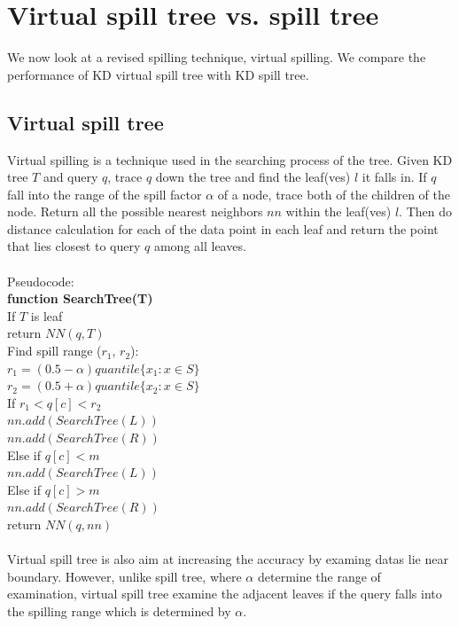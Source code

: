 \documentclass[paper=letter, fontsize=12pt]{article} %
\begin{document}
\section{Virtual spill tree vs. spill tree}
We now look at a revised spilling technique, virtual spilling. We compare the performance of KD virtual spill tree with KD spill tree.

\subsection{Virtual spill tree}
Virtual spilling is a technique used in the searching process of the tree. Given KD tree $T$ and query $q$, trace $q$ down the tree and find the leaf(ves) $l$ it falls in. If $q$ fall into the range of the spill factor $\alpha$ of a node, trace both of the children of the node. Return all the possible nearest neighbors $nn$ within the leaf(ves) $l$. Then do distance calculation for each of the data point in each leaf and return the point that lies closest to query $q$ among all leaves.
\\~\\
Pseudocode:\\
\hspace*{1em} \textbf{function SearchTree(T)}\\
\hspace*{2em} If $T$ is leaf\\
\hspace*{3em} return $NN(q, T)$\\
\hspace*{2em} Find spill range ($r_1$, $r_2$):\\
\hspace*{3em} $r_1 = (0.5-\alpha)quantile  \{ x_1: x \in S\}$\\
\hspace*{3em} $r_2 = (0.5+\alpha)quantile \{ x_2: x \in S\}$\\
\hspace*{2em} If $r_1 < q[c] < r_2$\\
\hspace*{3em} $nn.add(SearchTree(L))$\\
\hspace*{3em} $nn.add(SearchTree(R))$\\
\hspace*{2em} Else if $q[c] < m$\\
\hspace*{3em} $nn.add(SearchTree(L))$\\
\hspace*{2em} Else if $q[c] > m$\\
\hspace*{3em} $nn.add(SearchTree(R))$\\
\hspace*{2em} return $NN(q,nn)$
\\~\\
\hspace*{2em} Virtual spill tree is also aim at increasing the accuracy by examing datas lie near boundary. However, unlike spill tree, where $\alpha$ determine the range of examination, virtual spill tree examine the adjacent leaves if the query falls into the spilling range which is determined by $\alpha$.
\end{document}

